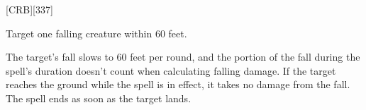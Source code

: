 
[CRB][337]





Target one falling creature within 60 feet.

The target's fall slows to 60 feet per round, and the portion of the fall during the spell's duration doesn't count when calculating falling damage.
If the target reaches the ground while the spell is in effect, it takes no damage from the fall.
The spell ends as soon as the target lands.

